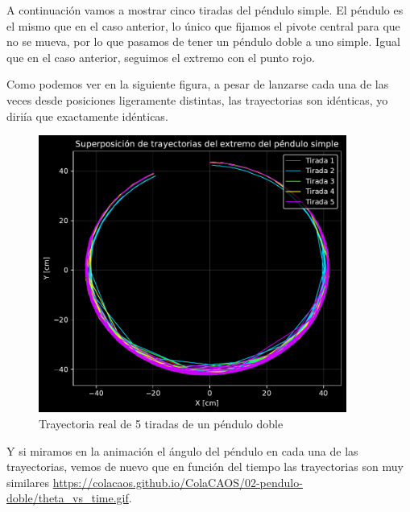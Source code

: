\documentclass[
  10pt,
  a4paper,
  DIV=11,
  numbers=noendperiod,
  open=any]{scrreprt}
\numberwithin{equation}{chapter}
\numberwithin{equation}{section}
\renewcommand{\[}{\begin{equation}}
\renewcommand{\]}{\end{equation}}
\begin{document}
A continuación vamos a mostrar cinco tiradas del péndulo simple. El
péndulo es el mismo que en el caso anterior, lo único que fijamos el
pivote central para que no se mueva, por lo que pasamos de tener un
péndulo doble a uno simple. Igual que en el caso anterior, seguimos el
extremo con el punto rojo.

Como podemos ver en la siguiente figura, a pesar de lanzarse cada una de
las veces desde posiciones ligeramente distintas, las trayectorias son
idénticas, yo diriía que exactamente idénticas.

\begin{figure}[h]
  \centering
  \includegraphics[width=0.9\textwidth]{02-pendulo-doble/experimentos_files/figure-pdf/cell-3-output-1.pdf}
  \caption{Trayectoria real de 5 tiradas de un péndulo doble}
\end{figure}

Y si miramos en la animación el ángulo del péndulo en cada una de las
trayectorias, vemos de nuevo que en función del tiempo las trayectorias
son muy similares \url{https://colacaos.github.io/ColaCAOS/02-pendulo-doble/theta_vs_time.gif}.
\end{document}
